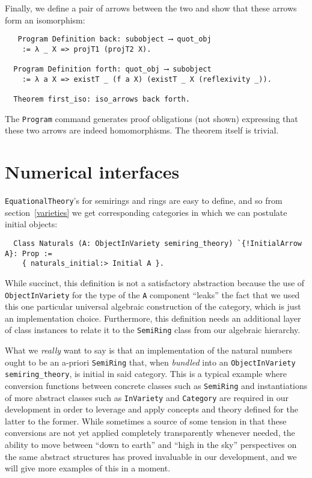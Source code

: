 \documentclass[a4paper,10pt,runningheads]{llncs}
\begin{document}
Finally, we define a pair of arrows between the two and show that these arrows form an isomorphism:
\begin{lstlisting}
   Program Definition back: subobject ⟶ quot_obj
    := λ _ X => projT1 (projT2 X).

  Program Definition forth: quot_obj ⟶ subobject
    := λ a X => existT _ (f a X) (existT _ X (reflexivity _)).

  Theorem first_iso: iso_arrows back forth.
\end{lstlisting}
The \lstinline|Program| command generates proof obligations (not shown) expressing that these two arrows are indeed homomorphisms. The theorem itself is trivial.


\section{Numerical interfaces}

\lstinline|EquationalTheory|'s for semirings and rings are easy to define, and so from section~\ref{varieties} we get corresponding categories in which we can postulate initial objects:
\begin{lstlisting}
  Class Naturals (A: ObjectInVariety semiring_theory) `{!InitialArrow A}: Prop :=
    { naturals_initial:> Initial A }.
\end{lstlisting}
While succinct, this definition is not a satisfactory abstraction because the use of \lstinline|ObjectInVariety| for the type of the \lstinline|A| component ``leaks'' the fact that we used this one particular universal algebraic construction of the category, which is just an implementation choice. Furthermore, this definition needs an additional layer of class instances to relate it to the \lstinline|SemiRing| class from our algebraic hierarchy.

What we \emph{really} want to say is that an implementation of the natural numbers ought to be an a-priori \lstinline|SemiRing| that, when \emph{bundled} into an \lstinline|ObjectInVariety semiring_theory|, is initial in said category. This is a typical example where conversion functions between concrete classes such as \lstinline|SemiRing| and instantiations of more abstract classes such as \lstinline|InVariety| and \lstinline|Category| are required in our development in order to leverage and apply concepts and theory defined for the latter to the former. While sometimes a source of some tension in that these conversions are not yet applied completely transparently whenever needed, the ability to move between ``down to earth'' and ``high in the sky'' perspectives on the same abstract structures has proved invaluable in our development, and we will give more examples of this in a moment.
\end{document}
